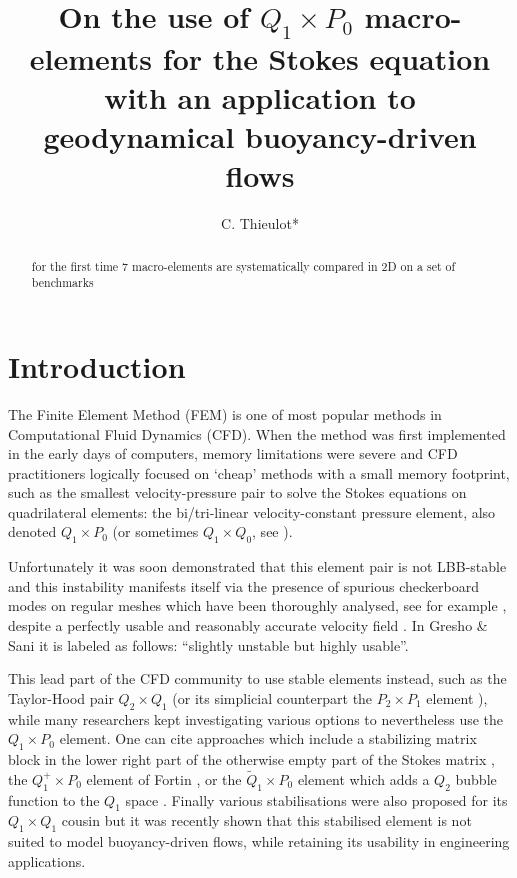 \documentclass[a4paper,12pt]{article}
\title{
On the use of $Q_1\times P_0$ macro-elements for the Stokes equation with an application to 
geodynamical buoyancy-driven flows
}
\author{C. Thieulot*}
\begin{document}
\maketitle

\begin{abstract}
for the first time 7 macro-elements are systematically compared in 2D on a set of benchmarks
\end{abstract}


\section{Introduction} \label{sec1}


The Finite Element Method (FEM) is one of most popular methods in Computational Fluid Dynamics (CFD). 
When the method was first implemented 
in the early days of computers, memory limitations were severe and CFD practitioners logically 
focused on `cheap' methods with a small memory footprint, such as the smallest velocity-pressure pair to 
solve the Stokes equations on quadrilateral elements: the bi/tri-linear velocity-constant pressure element, 
also denoted $Q_1 \times P_0$ (or sometimes $Q_1\times Q_0$, see \cite{grsa}). 

Unfortunately it was soon demonstrated that this element pair is not LBB-stable \cite{boni84,boni85} 
and this instability
manifests itself via the presence of spurious checkerboard modes on regular meshes
which have been thoroughly analysed, see for example \cite{grsi94,chpc95,sagl81a,sagl81b}, 
despite a perfectly usable and reasonably accurate velocity field \cite{grsa,dohu03,bobf08,bobf13}.
In Gresho \& Sani \cite{grsa} it is labeled as follows: ``slightly unstable but highly usable''.

This lead part of the CFD community to use stable elements instead, 
such as the Taylor-Hood pair $Q_2\times Q_1$
(or its simplicial counterpart the $P_2\times P_1$ element \cite{thba25}), 
while many researchers kept investigating various options to nevertheless use the $Q_1\times P_0$ element.
One can cite approaches which include a stabilizing matrix block in the lower right part of 
the otherwise empty part of the Stokes matrix \cite{kesi88,sike90,vibo92,nosi98},
the $Q_1^+\times P_0$ element of Fortin \cite{fort81}, or the $\tilde{Q}_1\times P_0$ element which adds 
a $Q_2$ bubble function to the $Q_1$ space \cite[p265]{brfo}.
Finally various stabilisations were also proposed for its 
$Q_1\times Q_1$ cousin \cite{dobo04,bodg06,busa13} but it was recently shown\cite{thba22} 
that this stabilised element is not suited to model buoyancy-driven flows, 
while retaining its usability in engineering applications.  
\end{document}
